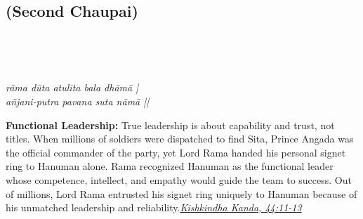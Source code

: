 
\newpage

\subsection*{ (Second Chaupai)}

\begin{minipage}[t]{0.55\textwidth}
\vspace{0pt}

{\large \linespread{1.5}\selectfont
{}\\
\par}

\vspace{0.5em}

{\large \linespread{1.5}\selectfont
{}\\
\par}

\vspace{0.5em}

{\large \linespread{1.3}\selectfont
\textit{rāma dūta atulita bala dhāmā |}\\
\textit{añjani-putra pavana suta nāmā ||}
\par}
\end{minipage}%
\hfill
\begin{minipage}[t]{0.42\textwidth}
\vspace{0pt}
\begin{tcolorbox}[anchorbox]
\textbf{Functional Leadership:} True leadership is about capability and trust, not titles. When millions of soldiers were dispatched to find Sita, Prince Angada was the official commander of the party, yet Lord Rama handed his personal signet ring to Hanuman alone. Rama recognized Hanuman as the functional leader whose competence, intellect, and empathy would guide the team to success.
\vspace{0.5em}\newline Out of millions, Lord Rama entrusted his signet ring uniquely to Hanuman because of his unmatched leadership and reliability.\newline\null\hfill\href{https://www.valmiki.iitk.ac.in/sloka?field_kanda_tid=4&language=dv&field_sarga_value=44}{\textit{Kishkindha Kanda, 44:11-13}}
\end{tcolorbox}
\end{minipage}

